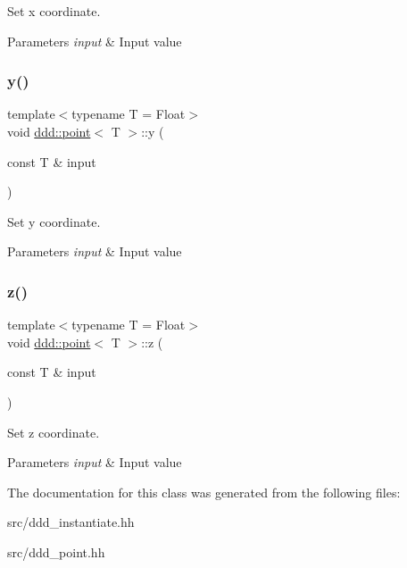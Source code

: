 Set x coordinate. 


\begin{DoxyParams}{Parameters}
{\em input} & Input value \\
\hline
\end{DoxyParams}
\mbox{\label{classddd_1_1point_a1e82b3a003d07248a7e1c8bc83ad0a58}} 
\subsubsection{\texorpdfstring{y()}{y()}}
{\footnotesize\ttfamily template$<$typename T = Float$>$ \\
void \hyperlink{classddd_1_1point}{ddd\+::point}$<$ T $>$\+::y (\begin{DoxyParamCaption}\item[{const T \&}]{input }\end{DoxyParamCaption})\hspace{0.3cm}{\ttfamily [inline]}}



Set y coordinate. 


\begin{DoxyParams}{Parameters}
{\em input} & Input value \\
\hline
\end{DoxyParams}
\mbox{\label{classddd_1_1point_a590cfe75da0948d3b7ef19cf8324f001}} 
\subsubsection{\texorpdfstring{z()}{z()}}
{\footnotesize\ttfamily template$<$typename T = Float$>$ \\
void \hyperlink{classddd_1_1point}{ddd\+::point}$<$ T $>$\+::z (\begin{DoxyParamCaption}\item[{const T \&}]{input }\end{DoxyParamCaption})\hspace{0.3cm}{\ttfamily [inline]}}



Set z coordinate. 


\begin{DoxyParams}{Parameters}
{\em input} & Input value \\
\hline
\end{DoxyParams}


The documentation for this class was generated from the following files\+:\begin{DoxyCompactItemize}
\item 
src/ddd\+\_\+instantiate.\+hh\item 
src/ddd\+\_\+point.\+hh\end{DoxyCompactItemize}
